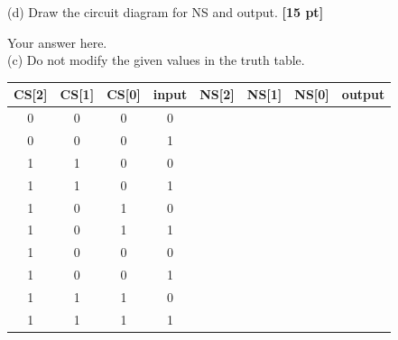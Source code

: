 \documentclass[a4paper]{article}
\begin{document}
(d) Draw the circuit diagram for NS and output. \textbf{[15 pt]}
\begin{answer}[Question 3]
    Your answer here. \\
    (c) Do not modify the given values in the truth table.\\
    \begin{center}
        \begin{tabular}{ |c|c|c|c||c|c|c|c| }
            \hline
            CS[2] & CS[1] & CS[0] & input & NS[2] & NS[1] & NS[0] & output \\
            \hline
            0     & 0     & 0     & 0     &       &       &       &        \\
            \hline
            0     & 0     & 0     & 1     &       &       &       &        \\
            \hline
            1     & 1     & 0     & 0     &       &       &       &        \\
            \hline
            1     & 1     & 0     & 1     &       &       &       &        \\
            \hline
            1     & 0     & 1     & 0     &       &       &       &        \\
            \hline
            1     & 0     & 1     & 1     &       &       &       &        \\
            \hline
            1     & 0     & 0     & 0     &       &       &       &        \\
            \hline
            1     & 0     & 0     & 1     &       &       &       &        \\
            \hline
            1     & 1     & 1     & 0     &       &       &       &        \\
            \hline
            1     & 1     & 1     & 1     &       &       &       &        \\
            \hline
        \end{tabular}
    \end{center}

\end{answer}
\end{document}
